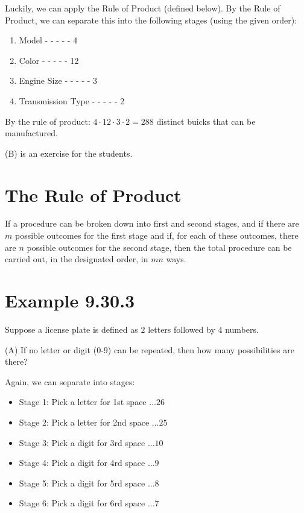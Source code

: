 \documentclass{article}
\begin{document}
Luckily, we can apply the Rule of Product (defined below). By the Rule
of Product, we can separate this into the following stages (using the
given order):

\begin{enumerate}
\item Model - - - - - 4
\item Color - - - - - 12
\item Engine Size - - - - - 3
\item Transmission Type - - - - - 2
\end{enumerate}

By the rule of product: $4\cdot{}12\cdot{}3\cdot{}2=288$ distinct
buicks that can be manufactured.

(B) is an exercise for the students.

\section*{The Rule of Product}

If a procedure can be broken down into first and second stages, and if
there are $m$ possible outcomes for the first stage and if, for each
of these outcomes, there are $n$ possible outcomes for the second
stage, then the total procedure can be carried out, in the designated
order, in $mn$ ways.

\section*{Example 9.30.3}

Suppose a license plate is defined as $2$ letters followed by $4$
numbers.

(A) If no letter or digit ($0$-$9$) can be repeated, then how many
possibilities are there?

Again, we can separate into stages:

\begin{itemize}
\item Stage 1: Pick a letter for 1st space $\ldots{}26$
\item Stage 2: Pick a letter for 2nd space $\ldots{}25$
\item Stage 3: Pick a digit for 3rd space $\ldots{}10$
\item Stage 4: Pick a digit for 4rd space $\ldots{}9$
\item Stage 5: Pick a digit for 5rd space $\ldots{}8$
\item Stage 6: Pick a digit for 6rd space $\ldots{}7$
\end{itemize}
\end{document}
